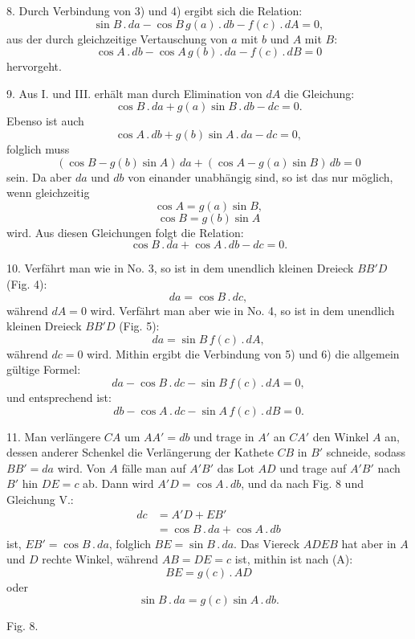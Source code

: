 %
8. Durch Verbindung von 3) und 4) ergibt sich die Relation:
\[
\tag*{III.} \sin B \,.\, da - \cos B\, g(a) \,.\, db - f(c) \,.\, dA = 0,
\]
aus der durch gleichzeitige Vertauschung von $a$ mit $b$ und $A$ mit $B$:
\[
\tag*{IV.} \cos A \,.\, db - \cos A\, g(b) \,.\, da - f(c) \,.\, dB = 0
\]
hervorgeht.

9. Aus I. und III. erhält man durch Elimination von $dA$ die Gleichung:
\[
\cos B \,.\, da + g(a) \sin B \,.\, db - dc = 0.
\]
Ebenso ist auch
\[
\cos A \,.\, db + g(b) \sin A \,.\, da - dc = 0,
\]
folglich muss
\[
(\cos B - g(b) \sin A)\, da + (\cos A - g(a) \sin B)\, db = 0
\]
sein. Da aber $da$ und $db$ von einander unabhängig sind, so ist das nur möglich,
wenn gleichzeitig
\[
\tag*{V. 1)} \cos A = g(a) \sin B,
\]
\[
\tag*{V. 2)} \cos B = g(b) \sin A
\]
wird. Aus diesen Gleichungen folgt die Relation:
\[
\tag*{V.} \cos B \,.\, da + \cos A \,.\, db - dc = 0.
\]

10. Verfährt man wie in No. 3, so ist in dem unendlich kleinen Dreieck $BB'D$
(Fig. 4):
\[
\tag*{5)} da = \cos B \,.\, dc,
\]
während $dA = 0$ wird. Verfährt man aber wie in No. 4, so ist in dem unendlich
kleinen Dreieck $BB'D$ (Fig. 5):
\[
\tag*{6)} da = \sin B\, f(c) \,.\, dA,
\]
während $dc = 0$ wird. Mithin ergibt die Verbindung von 5) und 6) die allgemein
gültige Formel:
\[
\tag*{VI.} da - \cos B \,.\, dc - \sin B\, f(c) \,.\, dA = 0,
\]
und entsprechend ist:
\[
\tag*{VII.} db - \cos A \,.\, dc - \sin A\, f(c) \,.\, dB = 0.
\]

11. Man verlängere $CA$ um $AA' = db$ und trage in $A'$ an $CA'$ den Winkel $A$
an, dessen anderer Schenkel die Verlängerung der Kathete $CB$ in $B'$ schneide,
sodass $BB' = da$ wird. Von $A$ fälle man auf $A'B'$ das Lot $AD$ 
und trage auf $A'B'$ nach $B'$ hin $DE = c$ ab. Dann wird $A'D = \cos A \,.\, db$,
und da nach Fig. 8 und Gleichung V.:
\[
\begin{aligned}dc &= A'D + EB'\\ &= \cos B \,.\, da + \cos A \,.\, db\end{aligned}
\]
ist, $EB' = \cos B \,.\, da$, folglich $BE = \sin B \,.\, da$. Das Viereck $ADEB$
hat aber in $A$ und $D$ rechte Winkel, während $AB = DE = c$ ist, mithin ist nach
(A):
\[
BE = g(c) \,.\, AD
\]
oder
\[
\sin B \,.\, da = g(c) \sin A \,.\, db.
\]

\begin{center}\begin{minipage}{\linewidth}\centering


Fig. 8.
\end{minipage}\end{center}
